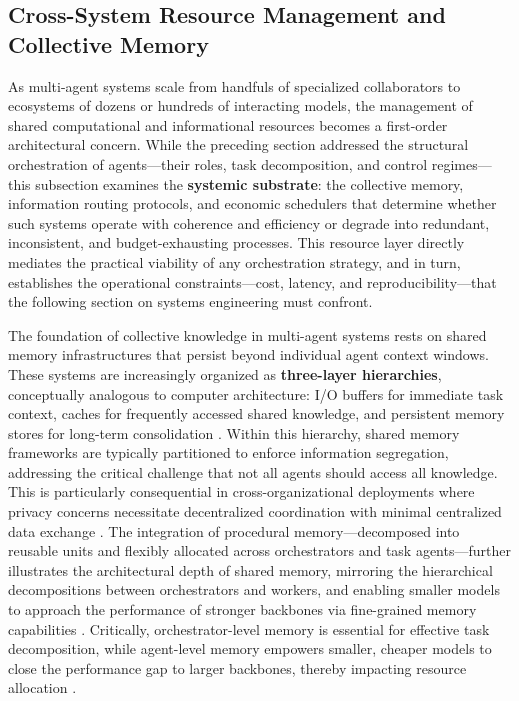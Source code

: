 \documentclass[11pt,a4paper]{article}
\begin{document}
\subsection{Cross-System Resource Management and Collective Memory}


As multi-agent systems scale from handfuls of specialized collaborators to ecosystems of dozens or hundreds of interacting models, the management of shared computational and informational resources becomes a first-order architectural concern. While the preceding section addressed the structural orchestration of agents---their roles, task decomposition, and control regimes---this subsection examines the \textbf{systemic substrate}: the collective memory, information routing protocols, and economic schedulers that determine whether such systems operate with coherence and efficiency or degrade into redundant, inconsistent, and budget-exhausting processes. This resource layer directly mediates the practical viability of any orchestration strategy, and in turn, establishes the operational constraints---cost, latency, and reproducibility---that the following section on systems engineering must confront.

The foundation of collective knowledge in multi-agent systems rests on shared memory infrastructures that persist beyond individual agent context windows. These systems are increasingly organized as \textbf{three-layer hierarchies}, conceptually analogous to computer architecture: I/O buffers for immediate task context, caches for frequently accessed shared knowledge, and persistent memory stores for long-term consolidation \cite{arxiv:2603.10062v2}. Within this hierarchy, shared memory frameworks are typically partitioned to enforce information segregation, addressing the critical challenge that not all agents should access all knowledge. This is particularly consequential in cross-organizational deployments where privacy concerns necessitate decentralized coordination with minimal centralized data exchange \cite{arxiv:2504.00587v2}. The integration of procedural memory---decomposed into reusable units and flexibly allocated across orchestrators and task agents---further illustrates the architectural depth of shared memory, mirroring the hierarchical decompositions between orchestrators and workers, and enabling smaller models to approach the performance of stronger backbones via fine-grained memory capabilities \cite{arxiv:2510.04851v1}. Critically, orchestrator-level memory is essential for effective task decomposition, while agent-level memory empowers smaller, cheaper models to close the performance gap to larger backbones, thereby impacting resource allocation \cite{arxiv:2510.04851v1}.
\end{document}
